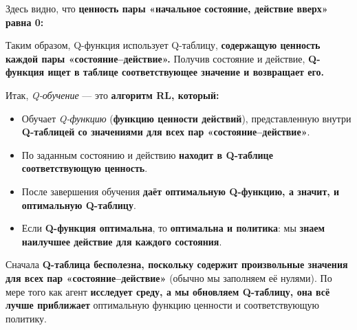 \documentclass[11pt,a4paper]{article}
\begin{document}
Здесь видно, что \textbf{ценность пары «начальное состояние, действие вверх» равна 0:}


Таким образом, Q-функция использует Q-таблицу, \textbf{содержащую ценность каждой пары «состояние--действие».} Получив состояние и действие, \textbf{Q-функция ищет в таблице соответствующее значение и возвращает его.}


Итак, \emph{Q-обучение} --- это \textbf{алгоритм RL, который:}

\begin{itemize}
\tightlist
\item
  Обучает \emph{Q-функцию} (\textbf{функцию ценности действий}), представленную внутри \textbf{Q-таблицей со значениями для всех пар «состояние--действие»}.
\item
  По заданным состоянию и действию \textbf{находит в Q-таблице соответствующую ценность}.
\item
  После завершения обучения \textbf{даёт оптимальную Q-функцию, а значит, и оптимальную Q-таблицу}.
\item
  Если \textbf{Q-функция оптимальна}, то \textbf{оптимальна и политика}: мы \textbf{знаем наилучшее действие для каждого состояния}.
\end{itemize}


Сначала \textbf{Q-таблица бесполезна, поскольку содержит произвольные значения для всех пар «состояние--действие»} (обычно мы заполняем её нулями). По мере того как агент \textbf{исследует среду, а мы обновляем Q-таблицу, она всё лучше приближает} оптимальную функцию ценности и соответствующую политику.

\end{document}
